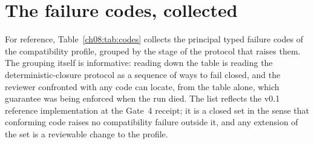 \section{The failure codes, collected}\label{ch08:codes}

For reference, Table~\ref{ch08:tab:codes} collects the principal typed failure codes of the compatibility profile, grouped by the stage of the protocol that raises them. The grouping itself is informative: reading down the table is reading the deterministic-closure protocol as a sequence of ways to fail closed, and the reviewer confronted with any code can locate, from the table alone, which guarantee was being enforced when the run died. The list reflects the v0.1 reference implementation at the Gate~4 receipt; it is a closed set in the sense that conforming code raises no compatibility failure outside it, and any extension of the set is a reviewable change to the profile.


